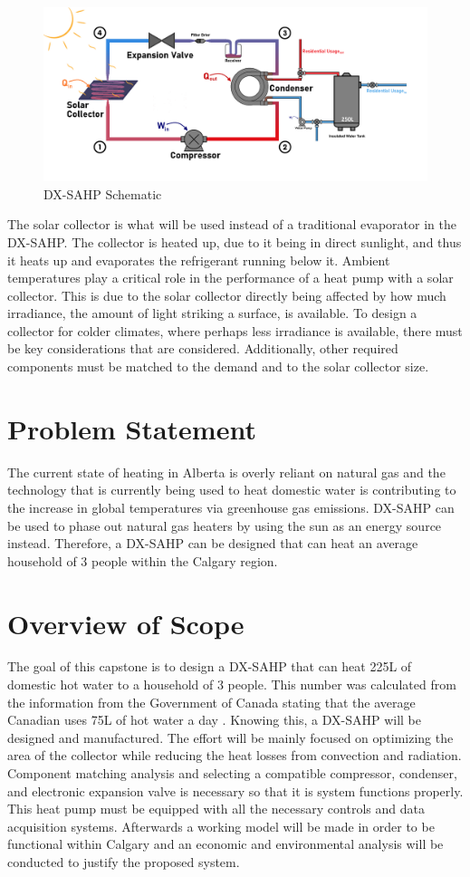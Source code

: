 \newpage
\begin{figure}[ht]
    \centering
    \includegraphics[width=\textwidth]{images/schematic.png}
    \caption{DX-SAHP Schematic}
\end{figure}
\medskip
The solar collector is what will be used instead of a traditional evaporator in the DX-SAHP. The collector is heated up, due to it being in direct sunlight, and thus it heats up and evaporates the refrigerant running below it. Ambient temperatures play a critical role in the performance of a heat pump with a solar collector. This is due to the solar collector directly being affected by how much irradiance, the amount of light striking a surface, is available. To design a collector for colder climates, where perhaps less irradiance is available, there must be key considerations that are considered. Additionally, other required components must be matched to the demand and to the solar collector size.

\section{Problem Statement}
The current state of heating in Alberta is overly reliant on natural gas and the technology that is currently being used to heat domestic water is contributing to the increase in global temperatures via greenhouse gas emissions. DX-SAHP can be used to phase out natural gas heaters by using the sun as an energy source instead. Therefore, a DX-SAHP can be designed that can heat an average household of 3 people within the Calgary region.

\section{Overview of Scope}
The goal of this capstone is to design a DX-SAHP that can heat 225L of domestic hot water to a household of 3 people. This number was calculated from the information from the Government of Canada stating that the average Canadian uses 75L of hot water a day \cite{water_heaters}. Knowing this, a DX-SAHP will be designed and manufactured. The effort will be mainly focused on optimizing the area of the collector while reducing the heat losses from convection and radiation. Component matching analysis and selecting a compatible compressor, condenser, and electronic expansion valve is necessary so that it is system functions properly. This heat pump must be equipped with all the necessary controls and data acquisition systems. Afterwards a working model will be made in order to be functional within Calgary and an economic and environmental analysis will be conducted to justify the proposed system.

